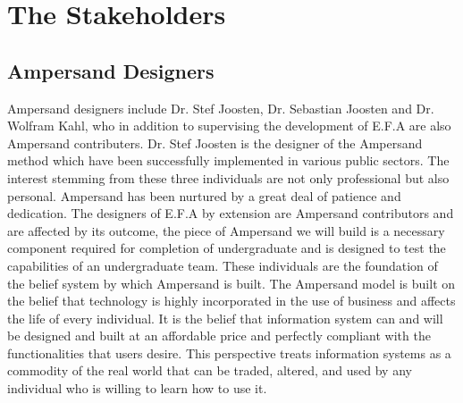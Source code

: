 \documentclass[12pt]{report}
\begin{document}
\section{The Stakeholders}\label{sec:Stakeholders}

\subsection{Ampersand Designers}\label{subsec:Ampersand}
Ampersand designers include Dr. Stef Joosten, Dr. Sebastian Joosten and Dr. 
Wolfram Kahl, who in addition to supervising the development of E.F.A are also 
Ampersand contributers. Dr. Stef Joosten is the designer of the Ampersand 
method which have been successfully implemented in various public sectors. The 
interest stemming from these three individuals are not only professional but 
also personal. Ampersand has been nurtured by a great deal of patience and 
dedication. The designers of E.F.A by extension are Ampersand contributors and 
are affected by its outcome, the piece of Ampersand we will build is a 
necessary component required for completion of undergraduate and is designed to 
test the capabilities of an undergraduate team. 
These individuals are the foundation of the belief system by which Ampersand is 
built. The Ampersand model is built on the belief that technology is highly 
incorporated in the use of business and affects the life of every individual. 
It is the belief that information system can and will be designed and built at 
an affordable price and perfectly compliant with the functionalities that users 
desire. This perspective treats information systems as a commodity of the real 
world that can be traded, altered, and used by any individual who is willing to 
learn how to use it.
\end{document}
